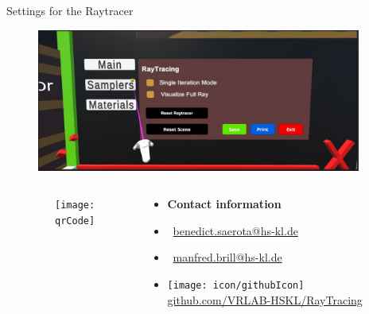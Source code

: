 \documentclass[final,hyperref={pdfpagelabels=false}]{beamer}
\begin{document}
\begin{frame}[t]
\begin{columns}[t]
\begin{column}{0.465\textwidth}
\begin{block}{Settings for the Raytracer}
    \begin{figure}
    	\centering
        \includegraphics[width=0.95\linewidth]{settings}
    \end{figure}
\end{block}
\end{column}
\begin{column}{.025\textwidth}\end{column} %
\end{columns}

\vspace*{1.25cm}

\begin{columns}[t]

\vspace*{0.2cm}

\begin{column}{0.025\textwidth}\end{column} %

\begin{column}{0.15\textwidth}
\begin{figure}[h]
\centering
\texttt{[image: qrCode]}
\end{figure}
\end{column}



\begin{column}{0.3\textwidth}
\vspace*{3.0cm}
\begin{itemize}
\item[] \textbf{Contact information}
\item[] \Letter\ \href{benedict.saerota@hs-kl.de}{benedict.saerota@hs-kl.de}
\item[] \Letter\ \href{manfred.brill@hs-kl.de}{manfred.brill@hs-kl.de}
\item[] \texttt{[image: icon/githubIcon]} \href{https://github.com/VRLAB-HSKL/RayTracing}{github.com/VRLAB-HSKL/RayTracing}
\end{itemize}
\end{column}


\end{columns}
\end{frame}
\end{document}
